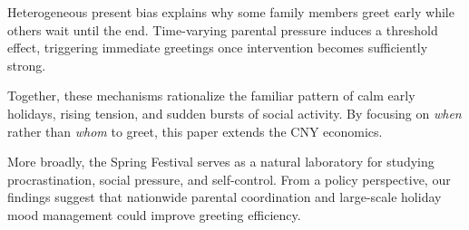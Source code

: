 \documentclass[AER]{AEA}
\begin{document}
Heterogeneous present bias explains why some family members greet early while others wait until the end. Time-varying parental pressure induces a threshold effect, triggering immediate greetings once intervention becomes sufficiently strong.

Together, these mechanisms rationalize the familiar pattern of calm early holidays, rising tension, and sudden bursts of social activity. By focusing on \textit{when} rather than \textit{whom} to greet, this paper extends the CNY economics.

More broadly, the Spring Festival serves as a natural laboratory for studying procrastination, social pressure, and self-control. From a policy perspective, our findings suggest that nationwide parental coordination and large-scale holiday mood management could improve greeting efficiency.

\FloatBarrier

\nocite{*}


\end{document}
